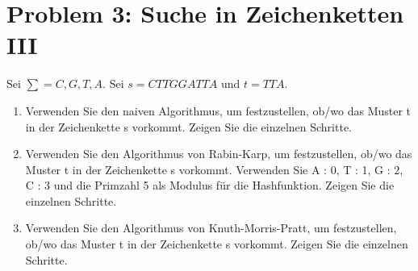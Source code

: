 \section*{Problem 3: Suche in Zeichenketten III}

 Sei $\sum = C, G, T, A.$ Sei $s = CTTGGATTA$ und $t = TTA$.



\begin{enumerate}
\item Verwenden Sie den naiven Algorithmus, um festzustellen, ob/wo das Muster t
in der Zeichenkette s vorkommt.
Zeigen Sie die einzelnen Schritte.

\item Verwenden Sie den Algorithmus von Rabin-Karp, um festzustellen, ob/wo das
Muster t in der Zeichenkette s vorkommt. Verwenden Sie A : 0, T : 1, G : 2, C :
3 und die Primzahl 5 als Modulus für die Hashfunktion.
Zeigen Sie die einzelnen Schritte.

\item  Verwenden Sie den Algorithmus von Knuth-Morris-Pratt, um festzustellen,
ob/wo das Muster t in der Zeichenkette s vorkommt.
Zeigen Sie die einzelnen Schritte.
\end{enumerate}